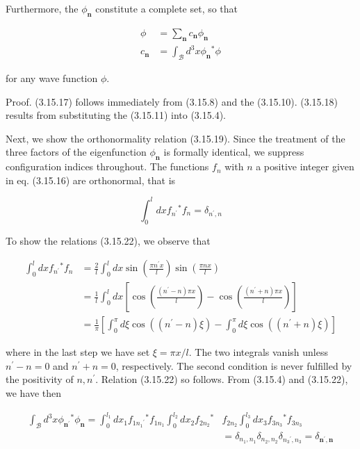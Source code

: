 \documentclass{article}
\begin{document}
Furthermore, the $\phi_{\boldsymbol{n}}$ constitute a complete set, so that
 
\begin{align*}
\phi & =\sum_{\boldsymbol{n}} c_{\boldsymbol{n}} \phi_{\boldsymbol{n}}  \tag{3.15.20}\\
c_{\boldsymbol{n}} & =\int_{\mathcal{B}} d^{3} x \phi_{\boldsymbol{n}}{ }^{*} \phi \tag{3.15.21}
\end{align*}
 
for any wave function $\phi$.

Proof. (3.15.17) follows immediately from (3.15.8) and the (3.15.10). (3.15.18) results from substituting the (3.15.11) into (3.15.4).

Next, we show the orthonormality relation (3.15.19). Since the treatment of the three factors of the eigenfunction $\phi_{\boldsymbol{n}}$ is formally identical, we suppress configuration indices throughout. The functions $f_{n}$ with $n$ a positive integer given in eq. (3.15.16)
are orthonormal, that is
 
\begin{equation*}
\int_{0}^{l} d x f_{n^{\prime}}{ }^{*} f_{n}=\delta_{n^{\prime}, n} \tag{3.15.22}
\end{equation*}
 

To show the relations (3.15.22), we observe that
 
\begin{align*}
\int_{0}^{l} d x f_{n^{\prime}}{ }^{*} f_{n} & =\frac{2}{l} \int_{0}^{l} d x \sin \left(\frac{\pi n^{\prime} x}{l}\right) \sin \left(\frac{\pi n x}{l}\right)  \tag{3.15.23}\\
& =\frac{1}{l} \int_{0}^{l} d x\left[\cos \left(\frac{\left(n^{\prime}-n\right) \pi x}{l}\right)-\cos \left(\frac{\left(n^{\prime}+n\right) \pi x}{l}\right)\right] \\
& =\frac{1}{\pi}\left[\int_{0}^{\pi} d \xi \cos \left(\left(n^{\prime}-n\right) \xi\right)-\int_{0}^{\pi} d \xi \cos \left(\left(n^{\prime}+n\right) \xi\right)\right]
\end{align*}
 
where in the last step we have set $\xi=\pi x / l$. The two integrals vanish unless $n^{\prime}-n=0$ and $n^{\prime}+n=0$, respectively. The second condition is never fulfilled by the positivity of $n, n^{\prime}$. Relation (3.15.22) so follows. From (3.15.4) and (3.15.22), we have then
 
\begin{align*}
\int_{\mathcal{B}} d^{3} x \phi_{\boldsymbol{n}^{\prime}}{ }^{*} \phi_{\boldsymbol{n}}=\int_{0}^{l_{1}} d x_{1} f_{1 n_{1}{ }^{\prime}}{ }^{*} f_{1 n_{1}} \int_{0}^{l_{2}} d x_{2} f_{2 n_{2}}{ }^{*} & f_{2 n_{2}} \int_{0}^{l_{3}} d x_{3} f_{3 n_{3}}{ }^{*} f_{3 n_{3}}  \tag{3.15.24}\\
& =\delta_{n_{1}, n_{1}} \delta_{n_{2}, n_{2}} \delta_{n_{3}{ }^{\prime}, n_{3}}=\delta_{\boldsymbol{n}^{\prime}, \boldsymbol{n}}
\end{align*}
 
\end{document}

